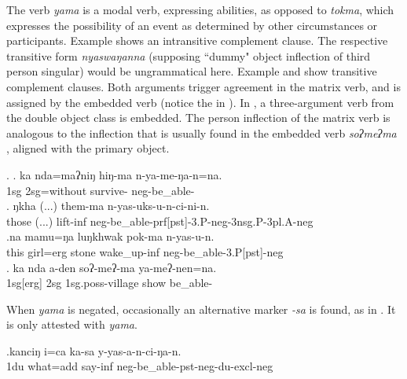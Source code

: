 The verb \emph{yama} is a modal verb, expressing abilities, as opposed to \emph{tokma}, which expresses the possibility of an event as determined by other circumstances or participants. Example \Next[a] shows an intransitive complement clause. The respective transitive form \emph{nyaswaŋanna} (supposing “dummy" object inflection of third person singular) would be ungrammatical here. Example \Next[b] and \Next[c] show transitive complement clauses.  Both arguments trigger agreement in the matrix verb, and  is assigned by the embedded verb (notice the  in \Next[c]). In \Next[d], a three-argument verb from the double object class is embedded. The person inflection of the matrix verb is analogous to the inflection that is usually found in the embedded verb  \emph{soʔmeʔma} , aligned with the primary object.

\ex. \ag. ka nda=maʔniŋ hiŋ-ma n-ya-me-ŋa-n=na.\\  
	 {\sc 1sg} {\sc 2sg=}without survive-  {\sc neg-}be\_able-\\
\bg. ŋkha (...) them-ma     n-yas-uks-u-n-ci-ni-n.\\
those (...) lift{\sc -inf} {\sc neg-}be\_able{\sc -prf[pst]-3.P-neg-3nsg.P-3pl.A-neg}\\
\bg.na   mamu=ŋa   luŋkhwak pok-ma        n-yas-u-n.\\
this girl{\sc =erg} stone wake\_up{\sc -inf} {\sc neg-}be\_able{\sc [3sg.A]-3.P[pst]-neg}\\
 
	\bg. ka nda a-den soʔ-meʔ-ma ya-meʔ-nen=na.\\
	{\sc 1sg[erg]} {\sc 2sg} {\sc 1sg.poss}-village  show be\_able-\\
	
When  \emph{yama} is negated, occasionally an alternative  marker \emph{-sa} is found, as in \Next. It is only attested with \emph{yama}.

\exg.kanciŋ  i=ca ka-sa y-yas-a-n-ci-ŋa-n.\\
{\sc 1du} what{\sc =add} say{\sc -inf} {\sc neg-}be\_able{\sc -pst-neg-du-excl-neg}\\
 


